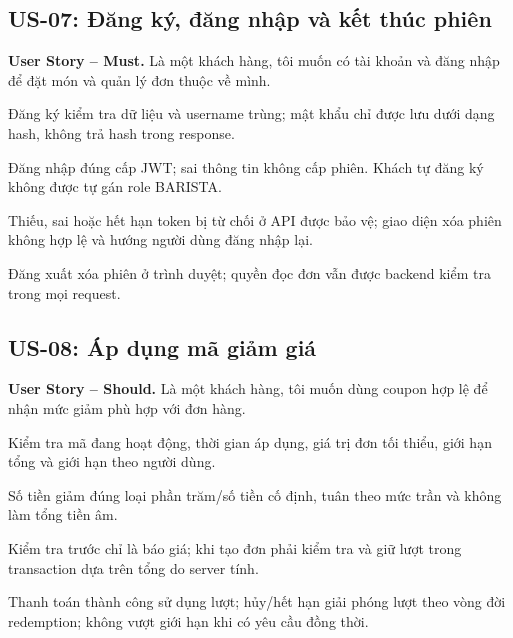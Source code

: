 \subsection{US-07: Đăng ký, đăng nhập và kết thúc phiên}
\label{us:07}
\noindent\textbf{User Story -- Must.}
Là một khách hàng, tôi muốn có tài khoản và đăng nhập để đặt món và quản
lý đơn thuộc về mình.
\begin{acceptance}
    \item Đăng ký kiểm tra dữ liệu và username trùng; mật khẩu chỉ được
    lưu dưới dạng hash, không trả hash trong response.
    \item Đăng nhập đúng cấp JWT; sai thông tin không cấp phiên.
    Khách tự đăng ký không được tự gán role BARISTA.
    \item Thiếu, sai hoặc hết hạn token bị từ chối ở API được bảo vệ;
    giao diện xóa phiên không hợp lệ và hướng người dùng đăng nhập lại.
    \item Đăng xuất xóa phiên ở trình duyệt; quyền đọc đơn vẫn được
    backend kiểm tra trong mọi request.
\end{acceptance}

\subsection{US-08: Áp dụng mã giảm giá}
\label{us:08}
\noindent\textbf{User Story -- Should.}
Là một khách hàng, tôi muốn dùng coupon hợp lệ để nhận mức giảm phù hợp
với đơn hàng.
\begin{acceptance}
    \item Kiểm tra mã đang hoạt động, thời gian áp dụng, giá trị đơn tối
    thiểu, giới hạn tổng và giới hạn theo người dùng.
    \item Số tiền giảm đúng loại phần trăm/số tiền cố định, tuân theo
    mức trần và không làm tổng tiền âm.
    \item Kiểm tra trước chỉ là báo giá; khi tạo đơn phải kiểm tra và
    giữ lượt trong transaction dựa trên tổng do server tính.
    \item Thanh toán thành công sử dụng lượt; hủy/hết hạn giải phóng lượt
    theo vòng đời redemption; không vượt giới hạn khi có yêu cầu đồng thời.
\end{acceptance}

